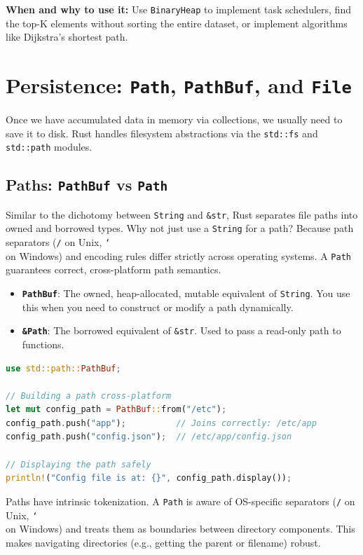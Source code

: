 \textbf{When and why to use it:} Use \texttt{BinaryHeap} to implement task schedulers, find the top-K elements without sorting the entire dataset, or implement algorithms like Dijkstra's shortest path.

\section{Persistence: \texttt{Path}, \texttt{PathBuf}, and \texttt{File}}

Once we have accumulated data in memory via collections, we usually need to save it to disk. Rust handles filesystem abstractions via the \texttt{std::fs} and \texttt{std::path} modules.

\subsection{Paths: \texttt{PathBuf} vs \texttt{Path}}
Similar to the dichotomy between \texttt{String} and \texttt{\&str}, Rust separates file paths into owned and borrowed types. 
Why not just use a \texttt{String} for a path? Because path separators (\texttt{/} on Unix, \texttt{\char`\\} on Windows) and encoding rules differ strictly across operating systems. A \texttt{Path} guarantees correct, cross-platform path semantics.

\begin{itemize}
    \item \textbf{\texttt{PathBuf}}: The owned, heap-allocated, mutable equivalent of \texttt{String}. You use this when you need to construct or modify a path dynamically.
    \item \textbf{\texttt{\&Path}}: The borrowed equivalent of \texttt{\&str}. Used to pass a read-only path to functions.
\end{itemize}

\begin{lstlisting}[language=Rust]
use std::path::PathBuf;

// Building a path cross-platform
let mut config_path = PathBuf::from("/etc");
config_path.push("app");          // Joins correctly: /etc/app
config_path.push("config.json");  // /etc/app/config.json

// Displaying the path safely
println!("Config file is at: {}", config_path.display());
\end{lstlisting}


\begin{insightbox}
Paths have intrinsic tokenization. A \texttt{Path} is aware of OS-specific separators (\texttt{/} on Unix, \texttt{\char`\\} on Windows) and treats them as boundaries between directory components. This makes navigating directories (e.g., getting the parent or filename) robust.
\end{insightbox}


